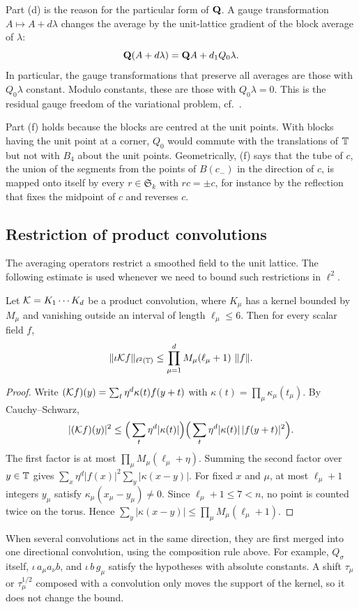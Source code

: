 Part (d) is the reason for the particular form of $\mathbf Q$. A gauge transformation $A\mapsto A+d\lambda$ changes the average by the unit-lattice gradient of the block average of $\lambda$:
\[
\mathbf Q(A+d\lambda)=\mathbf Q A+d_1 Q_0\lambda .
\]
In particular, the gauge transformations that preserve all averages are those with $Q_0\lambda$ constant. Modulo constants, these are those with $Q_0\lambda=0$. This is the residual gauge freedom of the variational problem, cf.\ \cite[(1.13), (1.20)]{BalPropI}.

Part (f) holds because the blocks are centred at the unit points. With blocks having the unit point at a corner, $Q_0$ would commute with the translations of $\mathbb T$ but not with $B_4$ about the unit points. Geometrically, (f) says that the tube of $c$, the union of the segments from the points of $B(c_-)$ in the direction of $c$, is mapped onto itself by every $r\in\mathfrak S_k$ with $rc=\pm c$, for instance by the reflection that fixes the midpoint of $c$ and reverses $c$.

\subsection{Restriction of product convolutions}\label{ss:2.5}

The averaging operators restrict a smoothed field to the unit lattice. The following estimate is used whenever we need to bound such restrictions in $\ell^2$.

\begin{lemma}\label{lem:restriction}
Let $\mathcal K=K_1\cdots K_d$ be a product convolution, where $K_\mu$ has a kernel bounded by $M_\mu$ and vanishing outside an interval of length $\ell_\mu\le6$. Then for every scalar field $f$,
\[
\|\iota\mathcal K f\|_{\ell^2(\mathbb T)}\le\prod_{\mu=1}^dM_\mu(\ell_\mu+1)\ \|f\| .
\]
\end{lemma}

\begin{proof}
Write $(\mathcal K f)(y)=\sum_t\eta^d\kappa(t)f(y+t)$ with $\kappa(t)=\prod_\mu\kappa_\mu(t_\mu)$. By Cauchy--Schwarz,
\[
|(\mathcal K f)(y)|^2\le\Big(\sum_t\eta^d|\kappa(t)|\Big)\Big(\sum_t\eta^d|\kappa(t)|\,|f(y+t)|^2\Big).
\]
The first factor is at most $\prod_\mu M_\mu(\ell_\mu+\eta)$. Summing the second factor over $y\in\mathbb T$ gives $\sum_x\eta^d|f(x)|^2\sum_y|\kappa(x-y)|$. For fixed $x$ and $\mu$, at most $\ell_\mu+1$ integers $y_\mu$ satisfy $\kappa_\mu(x_\mu-y_\mu)\neq0$. Since $\ell_\mu+1\le7<n$, no point is counted twice on the torus. Hence $\sum_y|\kappa(x-y)|\le\prod_\mu M_\mu(\ell_\mu+1)$.
\end{proof}

When several convolutions act in the same direction, they are first merged into one directional convolution, using the composition rule above. For example, $Q_\sigma$ itself, $\iota\,a_\mu a_\nu b$, and $\iota\,b\,g_\mu$ satisfy the hypotheses with absolute constants. A shift $\tau_\mu$ or $\tau^{1/2}_\mu$ composed with a convolution only moves the support of the kernel, so it does not change the bound.
